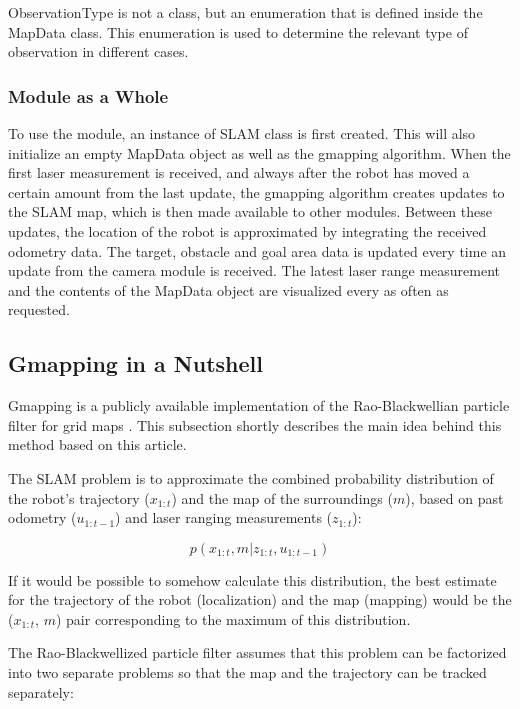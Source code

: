 \documentclass[a4paper,10pt]{article}
\begin{document}
ObservationType is not a class, but an enumeration that is defined inside the MapData class. This enumeration is used to determine the relevant type of observation in different cases.

\subsubsection{Module as a Whole}

To use the module, an instance of SLAM class is first created. This will also initialize an empty MapData object as well as the gmapping algorithm. When the first laser measurement is received, and always after the robot has moved a certain amount from the last update, the gmapping algorithm creates updates to the SLAM map, which is then made available to other modules. Between these updates, the location of the robot is approximated by integrating the received odometry data. The target, obstacle and goal area data is updated every time an update from the camera module is received. The latest laser range measurement and the contents of the MapData object are visualized every as often as requested.

\subsection{Gmapping in a Nutshell}

Gmapping is a publicly available implementation of the Rao-Blackwellian particle filter for grid maps \cite{Grisetti_improved}. This subsection shortly describes the main idea behind this method based on this article.

The SLAM problem is to approximate the combined probability distribution of the robot's trajectory ($x_{1:t}$) and the map of the surroundings ($m$), based on past odometry ($u_{1:t-1}$) and laser ranging measurements ($z_{1:t}$):

\begin{equation*}
p(x_{1:t}, m | z_{1:t}, u_{1:t-1})
\end{equation*}

If it would be possible to somehow calculate this distribution, the best estimate for the trajectory of the robot (localization) and the map (mapping) would be the ($x_{1:t}$, $m$) pair corresponding to the maximum of this distribution.

The Rao-Blackwellized particle filter assumes that this problem can be factorized into two separate problems so that the map and the trajectory can be tracked separately:
\end{document}
